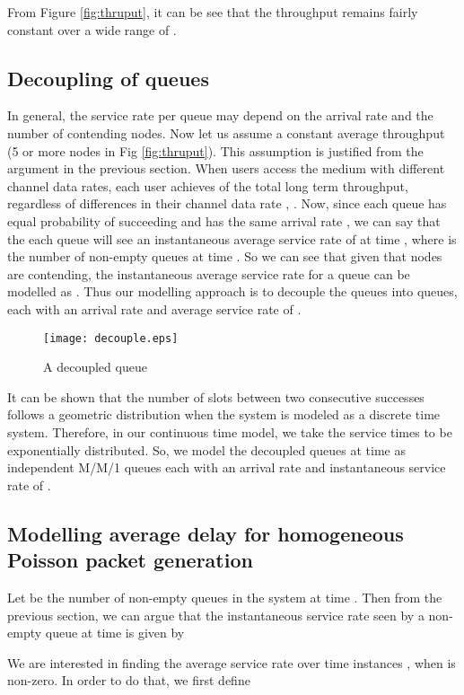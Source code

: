\documentclass[10pt, conference, compsocconf]{IEEEtran}
\begin{document}
From Figure \ref{fig:thruput}, it can be see that the throughput remains fairly constant over a wide range of .

\subsection{Decoupling of queues}
In general, the service rate per queue may depend on the arrival rate and the number of contending nodes. Now let us assume a constant average throughput  (5 or more nodes in Fig \ref{fig:thruput}). This assumption is justified from the argument in the previous section.  When  users access the medium with different channel data rates, each user achieves  of the total long term throughput, regardless of differences in their channel data rate \cite{hue}, \cite{sad}. Now, since each queue has equal probability of succeeding and has the same arrival rate , we can say that the each queue will see an instantaneous average service rate of  at time , where  is the number of non-empty queues at time . So we can see that given that  nodes are contending, the instantaneous average service rate for a queue can be modelled as . Thus our modelling approach is to decouple the queues into  queues, each with an arrival rate  and average service rate of .

\begin{figure}[h]
\centering
\texttt{[image: decouple.eps]}
\caption {A decoupled queue}
\label{fig:decouple}
\end{figure}

It can be shown that the number of slots between two consecutive successes follows a geometric distribution when the system is modeled as a discrete time system. Therefore, in our continuous time model, we take the service times to be exponentially distributed. So, we model the decoupled queues at time  as independent M/M/1 queues each with an arrival rate  and instantaneous service rate of .

\subsection{Modelling average delay for homogeneous Poisson packet generation}
Let  be the number of non-empty queues in the system at time . Then from the previous section, we can argue that the instantaneous  service rate seen by a non-empty queue at time  is given by

We are interested in finding the average service rate over time instances , when  is non-zero. In order to do that, we first define
\end{document}
